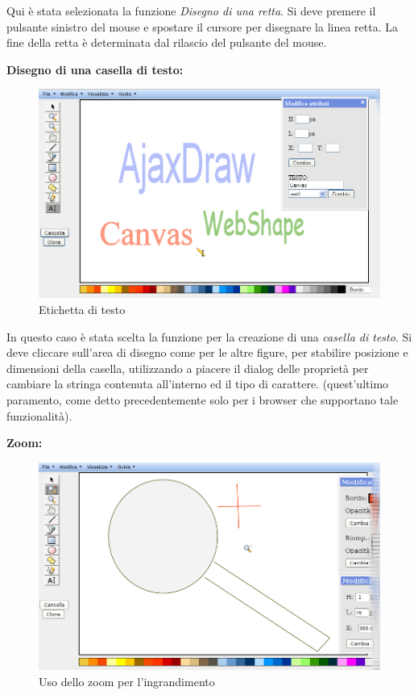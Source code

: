 \vspace{50pt}
Qui \`e stata selezionata la funzione \textit{Disegno di una retta}. Si deve premere il pulsante sinistro del mouse e spostare il cursore per disegnare la linea retta. La fine della retta \`e determinata dal rilascio del pulsante del mouse.
 
\newpage
\textbf{Disegno di una casella di testo:}\\ 
\begin{figure}[!ht]
\centering
\includegraphics[scale=0.5]{images/label.png}
\caption{Etichetta di testo}
\end{figure}
 
 
\vspace{100pt}
In questo caso \`e stata scelta la funzione per la creazione di una \textit{casella di testo}. Si deve cliccare sull'area di disegno come per le altre figure, per stabilire posizione e dimensioni della casella, utilizzando a piacere il dialog delle propriet\`a per cambiare la stringa contenuta all'interno ed il tipo di carattere. (quest'ultimo paramento, come detto precedentemente solo per i browser che supportano tale funzionalit\` a).
\newpage
 
\textbf{Zoom:}
\begin{figure}[!ht]
\centering
\includegraphics[scale=0.4]{images/zoom_piu.png}
\caption{Uso dello zoom per l'ingrandimento}
\end{figure}
 
